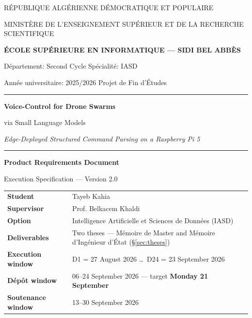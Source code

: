 \documentclass[11pt,a4paper]{article}
\begin{document}
\begin{titlepage}
\centering
\vspace*{0.4cm}

{\small R\'EPUBLIQUE ALG\'ERIENNE D\'EMOCRATIQUE ET POPULAIRE\par
MINIST\`ERE DE L'ENSEIGNEMENT SUP\'ERIEUR ET DE LA RECHERCHE SCIENTIFIQUE\par}

\vspace{0.8cm}
{\large\bfseries \'ECOLE SUP\'ERIEURE EN INFORMATIQUE --- SIDI BEL ABB\`ES\par}

\vspace{0.3cm}
{\small D\'epartement: Second Cycle \quad\textbullet\quad Sp\'ecialit\'e: IASD\par
Ann\'ee universitaire: 2025/2026 \quad\textbullet\quad Projet de Fin d'\'Etudes\par}

\vspace{1.6cm}
{\color{rulegray}\hrule height 1.2pt}
\vspace{0.9cm}

{\Huge\bfseries\color{accent} Voice-Control for Drone Swarms\par}
\vspace{0.45cm}
{\LARGE via Small Language Models\par}
\vspace{0.55cm}
{\large\itshape Edge-Deployed Structured Command Parsing on a Raspberry Pi 5\par}

\vspace{0.9cm}
{\color{rulegray}\hrule height 1.2pt}
\vspace{1.3cm}

{\large\bfseries Product Requirements Document\par}
\vspace{0.2cm}
{\large Execution Specification --- Version 2.0\par}

\vspace{1.7cm}

\begin{tabular}{@{}P{0.26}P{0.60}@{}}
\toprule
\textbf{Student}            & Tayeb Kahia \\
\textbf{Supervisor}         & Prof. Belkacem Khaldi \\
\textbf{Option}             & Intelligence Artificielle et Sciences de Donn\'ees (IASD) \\
\textbf{Deliverables}       & Two theses --- M\'emoire de Master and M\'emoire d'Ing\'enieur d'\'Etat
                              (\S\ref{sec:theses}) \\
\textbf{Execution window}   & D1 = 27 August 2026 \ldots\ D24 = 23 September 2026 \\
\textbf{D\'ep\^ot window}   & 06--24 September 2026 --- target \textbf{Monday 21 September} \\
\textbf{Soutenance window}  & 13--30 September 2026 \\
\bottomrule
\end{tabular}


\end{titlepage}
\end{document}
